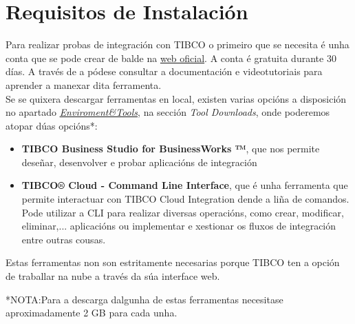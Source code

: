 \chapter{Requisitos de Instalación}
\label{chap:requisitos}
\begin{flushleft}
    Para realizar probas de integración con TIBCO o primeiro que se necesita é unha conta que se pode crear de balde na \href{https://account.cloud.tibco.com/signup/tci}{web oficial}. A conta é gratuita durante 30 días. A través de a pódese consultar a documentación e videotutoriais para aprender a manexar dita ferramenta.\\
    Se se quixera descargar ferramentas en local, existen varias opcións a disposición no apartado \textit{\href{https://eu.integration.cloud.tibco.com/envtools}{Enviroment\&Tools}}, na sección \textit{Tool Downloads}, onde poderemos atopar dúas opcións*: \\
    \begin{itemize}
        \item \textbf{TIBCO Business Studio for BusinessWorks ™}, que nos permite deseñar, desenvolver e probar aplicacións de integración\\
        \item \textbf{TIBCO® Cloud - Command Line Interface}, que é unha ferramenta que permite interactuar con TIBCO Cloud Integration dende a liña de comandos. Pode utilizar a CLI para realizar diversas operacións, como crear, modificar, eliminar,... aplicacións ou implementar e xestionar os fluxos de integración entre outras cousas.\\
    \end{itemize}
    Estas ferramentas non son estritamente necesarias porque TIBCO ten a opción de traballar na nube a través da súa interface web.
    
    *NOTA:Para a descarga dalgunha de estas ferramentas necesitase aproximadamente 2 GB para cada unha.
\end{flushleft}